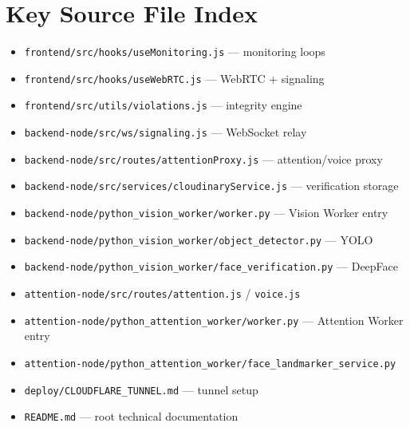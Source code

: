 \documentclass[11pt,a4paper]{report}
\begin{document}
\chapter{Key Source File Index}
\begin{itemize}
  \item \texttt{frontend/src/hooks/useMonitoring.js} --- monitoring loops
  \item \texttt{frontend/src/hooks/useWebRTC.js} --- WebRTC + signaling
  \item \texttt{frontend/src/utils/violations.js} --- integrity engine
  \item \texttt{backend-node/src/ws/signaling.js} --- WebSocket relay
  \item \texttt{backend-node/src/routes/attentionProxy.js} --- attention/voice proxy
  \item \texttt{backend-node/src/services/cloudinaryService.js} --- verification storage
  \item \texttt{backend-node/python\_vision\_worker/worker.py} --- Vision Worker entry
  \item \texttt{backend-node/python\_vision\_worker/object\_detector.py} --- YOLO
  \item \texttt{backend-node/python\_vision\_worker/face\_verification.py} --- DeepFace
  \item \texttt{attention-node/src/routes/attention.js} / \texttt{voice.js}
  \item \texttt{attention-node/python\_attention\_worker/worker.py} --- Attention Worker entry
  \item \texttt{attention-node/python\_attention\_worker/face\_landmarker\_service.py}
  \item \texttt{deploy/CLOUDFLARE\_TUNNEL.md} --- tunnel setup
  \item \texttt{README.md} --- root technical documentation
\end{itemize}
\end{document}
